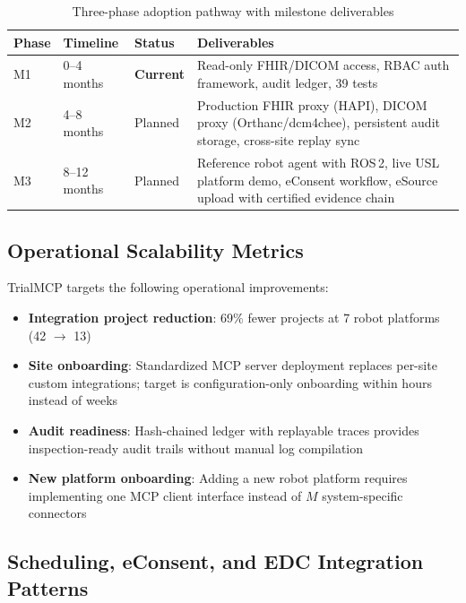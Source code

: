 \documentclass[10pt,letterpaper]{article}
\begin{document}
\begin{table}[H]
\centering
\caption{Three-phase adoption pathway with milestone deliverables}
\label{tab:milestones}
\small
\begin{tabularx}{\textwidth}{l l l X}
\toprule
\textbf{Phase} & \textbf{Timeline} & \textbf{Status} & \textbf{Deliverables} \\
\midrule
M1 & 0--4 months & \textbf{Current} & Read-only FHIR/DICOM access, RBAC auth framework, audit ledger, 39 tests \\
M2 & 4--8 months & Planned & Production FHIR proxy (HAPI), DICOM proxy (Orthanc/dcm4chee), persistent audit storage, cross-site replay sync \\
M3 & 8--12 months & Planned & Reference robot agent with ROS\,2, live USL platform demo, eConsent workflow, eSource upload with certified evidence chain \\
\bottomrule
\end{tabularx}
\end{table}

\subsection{Operational Scalability Metrics}

TrialMCP targets the following operational improvements:

\begin{itemize}[leftmargin=2em]
    \item \textbf{Integration project reduction}: 69\% fewer projects at 7 robot platforms (42 $\rightarrow$ 13)
    \item \textbf{Site onboarding}: Standardized MCP server deployment replaces per-site custom integrations; target is configuration-only onboarding within hours instead of weeks
    \item \textbf{Audit readiness}: Hash-chained ledger with replayable traces provides inspection-ready audit trails without manual log compilation
    \item \textbf{New platform onboarding}: Adding a new robot platform requires implementing one MCP client interface instead of $M$ system-specific connectors
\end{itemize}

\subsection{Scheduling, eConsent, and EDC Integration Patterns}
\end{document}
